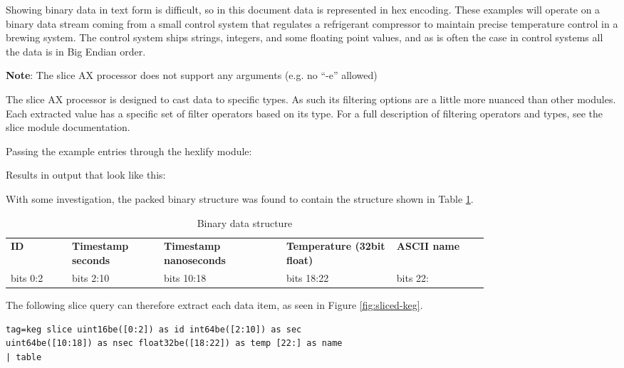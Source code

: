 Showing binary data in text form is difficult, so in this document data
is represented in hex encoding. These examples will operate on a binary
data stream coming from a small control system that regulates a
refrigerant compressor to maintain precise temperature control in a
brewing system. The control system ships strings, integers, and some
floating point values, and as is often the case in control systems all
the data is in Big Endian order.

\textbf{Note}: The slice AX processor does not support any arguments (e.g. no
``-e'' allowed)

The slice AX processor is designed to cast data to specific types. As
such its filtering options are a little more nuanced than other modules.
Each extracted value has a specific set of filter operators based on its
type. For a full description of filtering operators and types, see the
slice module documentation.

Passing the example entries through the hexlify module:


Results in output that look like this:


With some investigation, the packed binary structure was found to
contain the structure shown in Table \ref{table:keg-structure}.

\begin{table}
\begin{tabular}{p{0.1\linewidth}p{0.15\linewidth}p{0.2\linewidth}p{0.18\linewidth}p{0.15\linewidth}}
\hline
\textbf{ID} & \textbf{Timestamp seconds} & \textbf{Timestamp nanoseconds} & \textbf{Temperature (32bit float)} & \textbf{ASCII name} \\
{bits 0:2} & {bits 2:10} & {bits 10:18} & {bits 18:22} & {bits 22:} \\
\hline
\end{tabular}
\caption{Binary data structure}
\label{table:keg-structure}
\end{table}

The following slice query can therefore extract each data item, as seen in Figure \ref{fig:sliced-keg}.

\begin{Verbatim}[breaklines=true]
tag=keg slice uint16be([0:2]) as id int64be([2:10]) as sec 
uint64be([10:18]) as nsec float32be([18:22]) as temp [22:] as name
| table
\end{Verbatim}

